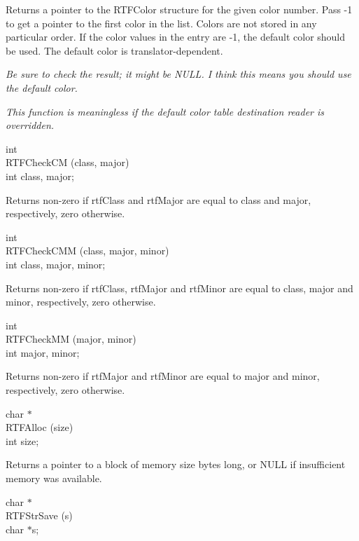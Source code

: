 \documentclass{article}
\begin{document}
\noindent
Returns a pointer to the RTFColor structure for the given color number. Pass 
-1 to get a pointer to the first color in the list. Colors are not stored 
in any particular order. If the color values in the entry are -1, the default 
color should be used. The default color is translator-dependent.



\noindent
{\em Be sure to check the result; it might be NULL. I think this means you 
should use the default color.



\noindent
{\em This function is meaningless if the default color table destination 
reader is overridden.



}}
\noindent
int\\
RTFCheckCM (class, major)\\
int	class, major;




\noindent
Returns non-zero if rtfClass and rtfMajor are equal to class and major, respectively, 
zero otherwise.




\noindent
int\\
RTFCheckCMM (class, major, minor)\\
int	class, major, minor;




\noindent
Returns non-zero if rtfClass, rtfMajor and rtfMinor are equal to class, major 
and minor, respectively, zero otherwise.




\noindent
int\\
RTFCheckMM (major, minor)\\
int	major, minor;




\noindent
Returns non-zero if rtfMajor and rtfMinor are equal to major and minor, respectively, 
zero otherwise.




\noindent
char $\ast $\\
RTFAlloc (size)\\
int	size;




\noindent
Returns a pointer to a block of memory size bytes long, or NULL if insufficient 
memory was available.




\noindent
char $\ast $\\
RTFStrSave (s)\\
char	$\ast $s;
\end{document}
